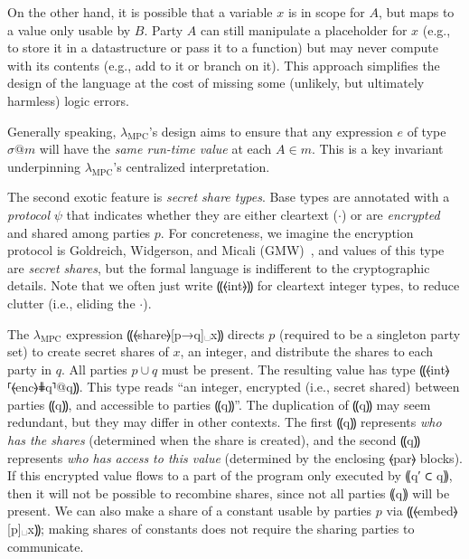 \documentclass{report}
\newcommand{\mpc}{\ensuremath{\lambda_{\mathrm{MPC}}}\xspace}
\begin{document}
On the other hand, it is possible that a variable $x$ is in scope for
$A$, but maps to a value only usable by $B$. Party $A$ can
still manipulate a placeholder for $x$ (e.g., to store it in a
datastructure or pass it to a function) but may never compute with its
contents (e.g., add to it or branch on it). This approach
simplifies the design of the language at the cost of missing some
(unlikely, but ultimately harmless) logic errors.

Generally speaking, \mpc's design aims to ensure that any expression
$e$ of type $\sigma @ m$ will have the \emph{same run-time value} at
each $A \in m$. This is a key invariant underpinning \mpc's centralized
interpretation.

The second exotic feature is \emph{secret share types}.
Base types are annotated with a
\emph{protocol} $\psi$ that indicates whether they are either
cleartext ($\cdot$) or are \emph{encrypted} and shared among parties
$p$. For concreteness, we imagine the encryption protocol is
Goldreich, Widgerson, and Micali (GMW)~\citeyear{STOC:GolMicWig87},
and values of this type are \emph{secret shares}, but the formal
language is indifferent to the cryptographic details. Note that we
often just write ⸨⦑int⦒⸩ for cleartext integer types, to reduce
clutter (i.e., eliding the $\cdot$).

The \mpc expression ⸨⦑share⦒[p→q]␣x⸩ directs $p$ (required to be a singleton party set) to
create secret shares of $x$, an integer, and distribute the shares to
each party in
$q$. All parties $p \cup q$ must be present. The resulting value
has type ⸨⦑int⦒⸢⦑enc⦒⋕q⸣@q⸩. This type reads “an integer, encrypted
(i.e., secret shared) between parties ⸨q⸩, and accessible to parties
⸨q⸩”. The duplication of ⸨q⸩ may seem redundant, but they may differ
in other contexts. The first ⸨q⸩ represents \emph{who has the
shares} (determined when the share is created), and the second ⸨q⸩
represents \emph{who has access to this value} (determined by the
enclosing ⦑par⦒ blocks). If this encrypted value flows to a part of
the program only executed by ⸨q′ ⊂ q⸩, then it will not be possible to
recombine shares, since not all parties ⸨q⸩ will be present.
We can also make a share of a constant
usable by parties $p$ via ⸨⦑embed⦒[p]␣x⸩; making shares of
constants does not require the sharing parties to communicate.
\end{document}
